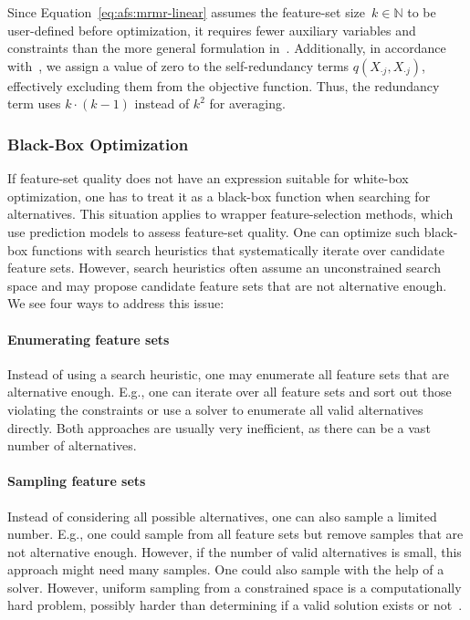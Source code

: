 \documentclass{article}
\theoremstyle{definition}
\begin{document}
Since Equation~\ref{eq:afs:mrmr-linear} assumes the feature-set size~$k \in \mathbb{N}$ to be user-defined before optimization, it requires fewer auxiliary variables and constraints than the more general formulation in~\cite{nguyen2009optimizing, nguyen2010towards}.
Additionally, in accordance with~\cite{nguyen2014effective}, we assign a value of zero to the self-redundancy terms $q(X_{\cdot{}j},X_{\cdot{}j})$, effectively excluding them from the objective function.
Thus, the redundancy term uses $k \cdot (k-1)$ instead of $k^2$ for averaging.

\subsubsection{Black-Box Optimization}
\label{sec:afs:approach:objectives:black-box}

If feature-set quality does not have an expression suitable for white-box optimization, one has to treat it as a black-box function when searching for alternatives.
This situation applies to wrapper feature-selection methods, which use prediction models to assess feature-set quality.
One can optimize such black-box functions with search heuristics that systematically iterate over candidate feature sets.
However, search heuristics often assume an unconstrained search space and may propose candidate feature sets that are not alternative enough.
We see four ways to address this issue:

\paragraph{Enumerating feature sets}

Instead of using a search heuristic, one may enumerate all feature sets that are alternative enough.
E.g., one can iterate over all feature sets and sort out those violating the constraints or use a solver to enumerate all valid alternatives directly.
Both approaches are usually very inefficient, as there can be a vast number of alternatives.

\paragraph{Sampling feature sets}

Instead of considering all possible alternatives, one can also sample a limited number.
E.g., one could sample from all feature sets but remove samples that are not alternative enough.
However, if the number of valid alternatives is small, this approach might need many samples.
One could also sample with the help of a solver.
However, uniform sampling from a constrained space is a computationally hard problem, possibly harder than determining if a valid solution exists or not~\cite{ermon2012uniform}.
\end{document}
